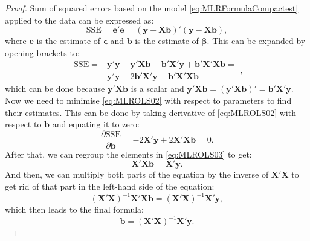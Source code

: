 \documentclass[
]{book}
\theoremstyle{definition}
\theoremstyle{definition}
\theoremstyle{definition}
\theoremstyle{definition}
\theoremstyle{remark}
\begin{document}
\begin{proof}
Sum of squared errors based on the model \eqref{eq:MLRFormulaCompactest} applied to the data can be expressed as:
\begin{equation*}
    \mathrm{SSE} = \mathbf{e}' \mathbf{e} = (\mathbf{y} - \mathbf{X} \mathbf{b})' (\mathbf{y} - \mathbf{X} \mathbf{b}) ,
\end{equation*}
where \(\mathbf{e}\) is the estimate of \(\boldsymbol{\epsilon}\) and \(\mathbf{b}\) is the estimate of \(\boldsymbol{\beta}\). This can be expanded by opening brackets to:
\begin{equation}
    \begin{aligned}
        \mathrm{SSE} = & \mathbf{y}'\mathbf{y} - \mathbf{y}' \mathbf{X} \mathbf{b} - \mathbf{b}' \mathbf{X}' \mathbf{y} + \mathbf{b}' \mathbf{X}' \mathbf{X} \mathbf{b} = \\
        & \mathbf{y}'\mathbf{y} - 2 \mathbf{b}' \mathbf{X}' \mathbf{y} + \mathbf{b}' \mathbf{X}' \mathbf{X} \mathbf{b}
    \end{aligned} ,
    \label{eq:MLROLS02}
\end{equation}
which can be done because \(\mathbf{y}' \mathbf{X} \mathbf{b}\) is a scalar and \(\mathbf{y}' \mathbf{X} \mathbf{b} = (\mathbf{y}' \mathbf{X} \mathbf{b})' = \mathbf{b}' \mathbf{X}' \mathbf{y}\). Now we need to minimise \eqref{eq:MLROLS02} with respect to parameters to find their estimates. This can be done by taking derivative of \eqref{eq:MLROLS02} with respect to \(\mathbf{b}\) and equating it to zero:
\begin{equation}
    \frac{\partial \mathrm{SSE}}{\partial \mathbf{b}} = - 2 \mathbf{X}' \mathbf{y} + 2 \mathbf{X}' \mathbf{X} \mathbf{b} = 0.
    \label{eq:MLROLS03}
\end{equation}
After that, we can regroup the elements in \eqref{eq:MLROLS03} to get:
\begin{equation*}
    \mathbf{X}' \mathbf{X} \mathbf{b} = \mathbf{X}' \mathbf{y}.
\end{equation*}
And then, we can multiply both parts of the equation by the inverse of \(\mathbf{X}' \mathbf{X}\) to get rid of that part in the left-hand side of the equation:
\begin{equation*}
    (\mathbf{X}' \mathbf{X})^{-1} \mathbf{X}' \mathbf{X} \mathbf{b} = (\mathbf{X}' \mathbf{X})^{-1} \mathbf{X}' \mathbf{y},
\end{equation*}
which then leads to the final formula:
\begin{equation*}
    \mathbf{b} = \left(\mathbf{X}' \mathbf{X}\right)^{-1} \mathbf{X}' \mathbf{y} .
\end{equation*}
\end{proof}
\end{document}

